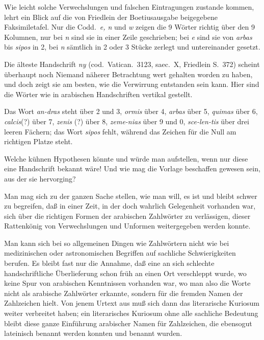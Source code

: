 \documentclass[11pt,a4paper]{article}
\begin{document}
Wie leicht solche Verwechslungen und falschen Eintragungen zustande kommen, lehrt ein Blick auf die von Friedlein der Boetiusausgabe beigegebene Faksimiletafel. Nur die Codd.\ \textit{e, n} und \textit{w} zeigen die 9 W\"orter richtig \"uber den 9 Kolumnen, nur bei \textit{n} sind sie in einer Zeile geschrieben; bei \textit{e} sind sie von \textit{arbas} bis \textit{sipos} in 2, bei \textit{n} s\"amtlich in 2 oder 3 St\"ucke zerlegt und untereinander gesetzt.

Die \"alteste Handschrift \textit{ny} (cod.\ Vatican.\ 3123, saec.\ X, Friedlein S.\ 372) scheint \"uberhaupt noch Niemand n\"aherer Betrachtung wert gehalten worden zu haben, und doch zeigt sie am besten, wie die Verwirrung entstanden sein kann. Hier sind die W\"orter wie in arabischen Handschriften vertikal gestellt.

Das Wort \textit{an-dras} steht \"uber 2 und 3, \textit{ormis} \"uber 4, \textit{arbas} \"uber 5, \textit{quimas} \"uber 6, \textit{calcis}(?) \"uber 7, \textit{zenis} (?) \"uber 8, \textit{zeme-nias} \"uber 9 und 0, \textit{sce-len-tis} \"uber drei leeren F\"achern; das Wort \textit{sipos} fehlt, w\"ahrend das Zeichen f\"ur die Null am richtigen Platze steht.

Welche k\"uhnen Hypothesen k\"onnte und w\"urde man aufstellen, wenn nur diese eine Handschrift bekannt w\"are! Und wie mag die Vorlage beschaffen gewesen sein, aus der sie hervorging?

Man mag sich zu der ganzen Sache stellen, wie man will, es ist und bleibt schwer zu begreifen, da\ss{} in einer Zeit, in der doch wahrlich Gelegenheit vorhanden war, sich \"uber die richtigen Formen der arabischen Zahlw\"orter zu verl\"assigen, dieser Rattenk\"onig von Verwechslungen und Unformen weitergegeben werden konnte.

Man kann sich bei so allgemeinen Dingen wie Zahlw\"ortern nicht wie bei medizinischen oder astronomischen Begriffen auf sachliche Schwierigkeiten berufen. Es bleibt fast nur die Annahme, da\ss{} eine an sich schlechte handschriftliche \"Uberlieferung schon fr\"uh an einen Ort verschleppt wurde, wo keine Spur von arabischen Kenntnissen vorhanden war, wo man also die Worte nicht als arabische Zahlw\"orter erkannte, sondern f\"ur die fremden Namen der Zahlzeichen hielt. Von jenem Urtext aus mu\ss{} sich dann das literarische Kuriosum weiter verbreitet haben; ein literarisches Kuriosum ohne alle sachliche Bedeutung bleibt diese ganze Einf\"uhrung arabischer Namen f\"ur Zahlzeichen, die ebensogut lateinisch benannt werden konnten und benannt wurden.
\end{document}
